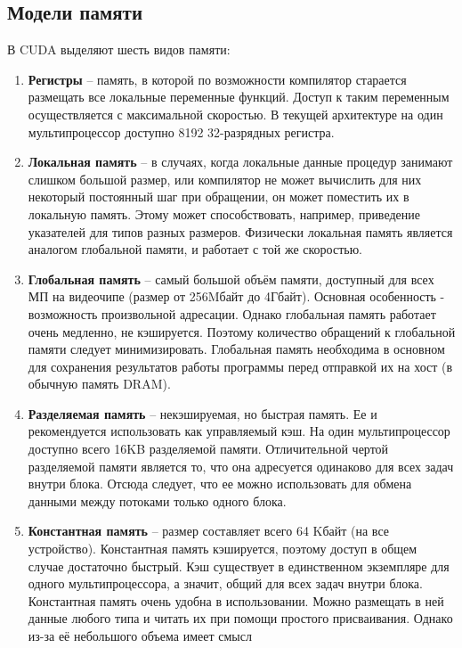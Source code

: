 \documentclass[a4paper, final]{article}
\begin{document}
    \subsection{Модели памяти}
    В CUDA выделяют шесть видов памяти:
    \begin{enumerate}
        \item \textbf{Регистры} -- память, в которой по возможности компилятор старается размещать все локальные переменные функций. Доступ к 
    таким переменным осуществляется с максимальной скоростью. В текущей архитектуре на один 
    мультипроцессор доступно 8192 32-разрядных регистра. 
    \item \textbf{Локальная память} --  в случаях, когда локальные данные процедур занимают слишком большой размер, или компилятор не может 
    вычислить для них некоторый постоянный шаг при обращении, он может поместить их в локальную память. Этому может способствовать, например, приведение указателей для типов разных размеров. Физически локальная память является аналогом глобальной памяти, и работает с той же скоростью.
    \item \textbf{Глобальная память} -- самый большой объём памяти, доступный для всех МП на видеочипе (размер от 256Mбайт до 4Гбайт). Основная особенность -  возможность 
    произвольной адресации. Однако глобальная память работает очень медленно, не кэшируется. Поэтому количество обращений к глобальной памяти следует минимизировать. Глобальная память необходима в основном для сохранения результатов работы программы перед отправкой 
    их на хост (в обычную память DRAM). 
    \item \textbf{Разделяемая память} -- некэшируемая, но быстрая память. Ее и рекомендуется использовать как 
    управляемый кэш. На один мультипроцессор доступно всего 16KB разделяемой памяти. 
    Отличительной чертой разделяемой памяти является то, что она адресуется одинаково для всех задач 
    внутри блока. Отсюда следует, что ее можно использовать для обмена данными между потоками 
    только одного блока.
    \item \textbf{Константная память} --  размер 
    составляет всего 64 Kбайт (на все устройство). Константная память кэшируется, поэтому доступ в общем случае достаточно быстрый. Кэш существует в единственном экземпляре для одного мультипроцессора, а значит, общий для всех задач внутри блока. 
    Константная память очень удобна в использовании. Можно размещать в ней данные любого типа и читать их 
    при помощи простого присваивания. Однако из-за её небольшого объема имеет смысл 

\end{enumerate}
\end{document}
